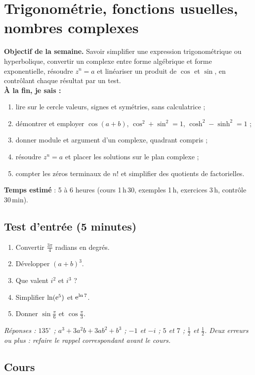 \clearpage
\section{Trigonométrie, fonctions usuelles, nombres complexes}
\renewcommand{\titrecourant}{Semaine 1}

\begin{boussole}
\textbf{Objectif de la semaine.} Savoir simplifier une expression trigonométrique ou hyperbolique, convertir un complexe entre forme algébrique et forme exponentielle, résoudre $z^n=a$ et linéariser un produit de $\cos$ et $\sin$, en contrôlant chaque résultat par un test.\\
\textbf{À la fin, je sais :}
\begin{enumerate}
 \item lire sur le cercle valeurs, signes et symétries, sans calculatrice ;
 \item démontrer et employer $\cos(a+b)$, $\cos^2+\sin^2=1$, $\cosh^2-\sinh^2=1$ ;
 \item donner module et argument d'un complexe, quadrant compris ;
 \item résoudre $z^n=a$ et placer les solutions sur le plan complexe ;
 \item compter les zéros terminaux de $n!$ et simplifier des quotients de factorielles.
\end{enumerate}
\textbf{Temps estimé} : 5 à 6 heures (cours 1\,h\,30, exemples 1\,h, exercices 3\,h, contrôle 30\,min).
\end{boussole}

\subsection{Test d'entrée (5 minutes)}
\begin{enumerate}
 \item Convertir $\tfrac{3\pi}{4}$ radians en degrés.
 \item Développer $(a+b)^3$.
 \item Que valent $i^2$ et $i^3$ ?
 \item Simplifier $\ln(\mathrm{e}^{5})$ et $\mathrm{e}^{\ln 7}$.
 \item Donner $\sin\tfrac\pi6$ et $\cos\tfrac\pi3$.
\end{enumerate}
\textit{Réponses : $135^\circ$ ; $a^3+3a^2b+3ab^2+b^3$ ; $-1$ et $-i$ ; $5$ et $7$ ; $\tfrac12$ et $\tfrac12$. Deux erreurs ou plus : refaire le rappel correspondant avant le cours.}

\subsection{Cours}
